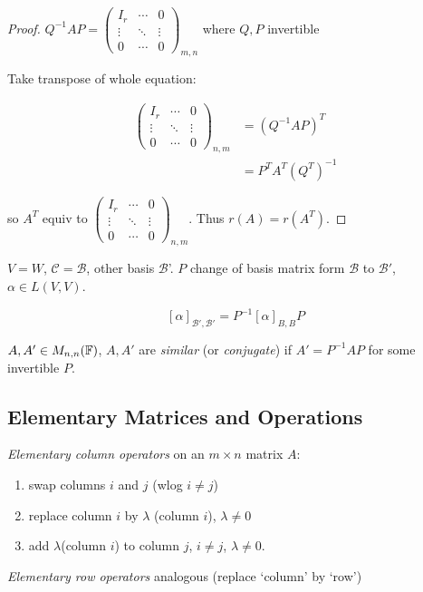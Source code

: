 \documentclass[a4paper]{article}
\begin{document}
\begin{proof}
	$ Q^{-1} A P = \begin{pmatrix}
	I_{r} & \cdots & 0 \\
	\vdots & \ddots & \vdots \\
	0 & \cdots & 0  
	\end{pmatrix}_{m,n} $ where $ Q,P $ invertible 
	
	Take transpose of whole equation:
	
	\begin{align*}
	\begin{pmatrix}
	I_{r} & \cdots & 0 \\
	\vdots & \ddots & \vdots \\
	0 & \cdots & 0  
	\end{pmatrix}_{n,m} & = (Q^{-1} A P)^{T} \\
	& = P^{T} A^{T} (Q^{T})^{-1}
	\end{align*}
	
	so $ A^{T} $ equiv to $ 	\begin{pmatrix}
	I_{r} & \cdots & 0 \\
	\vdots & \ddots & \vdots \\
	0 & \cdots & 0  
	\end{pmatrix}_{n,m} $. Thus $ r(A) = r(A^{T})  $.
	
	
	
\end{proof}



$ V = W $, $ \mathcal{C} = \mathcal{B} $, other basis $ \mathcal{B} $'. $ P $ change of basis matrix form $ \mathcal{B} $ to $ \mathcal{B}' $, $ \alpha \in L(V,V) $. 

\[ [\alpha]_{\mathcal{B}',\mathcal{B}'} = P^{-1} [\alpha]_{B,B}  P \]

\begin{defi}
	$ A,A' \in M_{n,n}(\mathbb{F}) $, $ A, A' $ are \emph{similar} (or \emph{conjugate}) if $ A'  = P^{-1}  A P $ for  some invertible $ P $.  
\end{defi}

\subsection{Elementary Matrices and Operations}

\begin{defi}
	\emph{Elementary column operators} on an $ m \times n $ matrix $ A $:
	
	\begin{enumerate}
		\item swap columns $ i $ and $ j $ (wlog $ i \neq j $)
		\item replace column $ i $ by $ \lambda $ (column $ i $), $ \lambda \neq 0 $
		\item add $ \lambda $(column $ i $) to column $ j $, $ i \neq j $, $ \lambda \neq 0$.
	\end{enumerate}
\emph{Elementary row operators} analogous (replace `column' by `row')
\end{defi}
\end{document}
